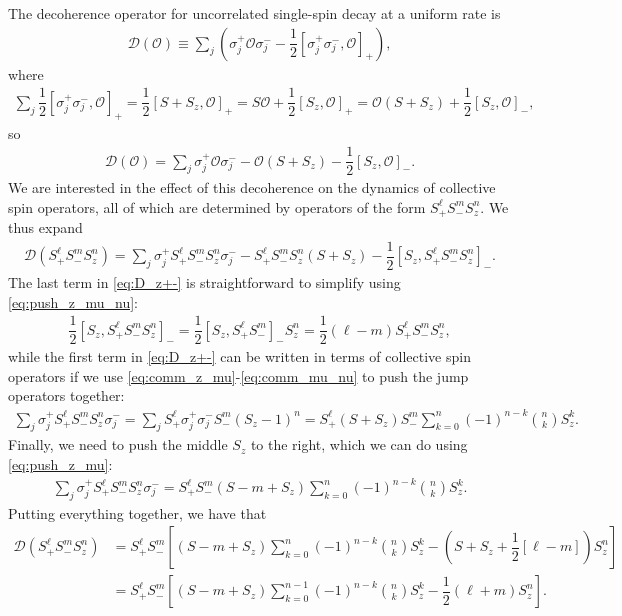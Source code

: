 \documentclass[aps,notitlepage,nofootinbib,11pt]{revtex4-1}
\newcommand{\f}[2]{\dfrac{#1}{#2}} %
\newcommand{\p}[1]{\left(#1\right)} %
\renewcommand{\sp}[1]{\left[#1\right]} %
\newcommand{\D}{\mathcal{D}}
\renewcommand{\O}{\mathcal{O}}
\newcommand{\1}{\mathds{1}}
\begin{document}
The decoherence operator for uncorrelated single-spin decay at a
uniform rate is
\begin{align}
  \D\p{\O}
  \equiv \sum_j\p{\sigma_j^+\O\sigma_j^-
    - \f12\sp{\sigma_j^+\sigma_j^-,\O}_+},
\end{align}
where
\begin{align}
  \sum_j \f12\sp{\sigma_j^+\sigma_j^-,\O}_+
  = \f12\sp{S+S_z,\O}_+
  = S\O + \f12\sp{S_z,\O}_+
  = \O\p{S+S_z} + \f12\sp{S_z,\O}_-,
\end{align}
so
\begin{align}
  \D\p{\O}
  = \sum_j \sigma_j^+\O\sigma_j^- - \O\p{S + S_z} - \f12 \sp{S_z,\O}_-.
\end{align}
We are interested in the effect of this decoherence on the dynamics of
collective spin operators, all of which are determined by operators of
the form $S_+^\ell S_-^m S_z^n$.  We thus expand
\begin{align}
  \D\p{S_+^\ell S_-^m S_z^n}
  = \sum_j \sigma_j^+ S_+^\ell S_-^m S_z^n \sigma_j^-
  - S_+^\ell S_-^m S_z^n \p{S + S_z}
  - \f12 \sp{S_z, S_+^\ell S_-^m S_z^n}_-.
  \label{eq:D_z+-}
\end{align}
The last term in \eqref{eq:D_z+-} is straightforward to simplify using
\eqref{eq:push_z_mu_nu}:
\begin{align}
  \f12 \sp{S_z, S_+^\ell S_-^m S_z^n}_-
  = \f12 \sp{S_z, S_+^\ell S_-^m}_- S_z^n
  = \f12 \p{\ell-m} S_+^\ell S_-^m S_z^n,
\end{align}
while the first term in \eqref{eq:D_z+-} can be written in terms of
collective spin operators if we use
\eqref{eq:comm_z_mu}-\eqref{eq:comm_mu_nu} to push the jump operators
together:
\begin{align}
  \sum_j \sigma_j^+ S_+^\ell S_-^m S_z^n \sigma_j^-
  = \sum_j S_+^\ell \sigma_j^+ \sigma_j^- S_-^m \p{S_z-1}^n
  = S_+^\ell \p{S + S_z} S_-^m
  \sum_{k=0}^n \p{-1}^{n-k} { n \choose k } S_z^k.
\end{align}
Finally, we need to push the middle $S_z$ to the right, which we can
do using \eqref{eq:push_z_mu}:
\begin{align}
  \sum_j \sigma_j^+ S_+^\ell S_-^m S_z^n \sigma_j^-
  = S_+^\ell S_-^m \p{S - m + S_z}
  \sum_{k=0}^n \p{-1}^{n-k} { n \choose k } S_z^k.
\end{align}
Putting everything together, we have that
\begin{align}
  \D\p{S_+^\ell S_-^m S_z^n}
  &= S_+^\ell S_-^m \sp{\p{S - m + S_z} \sum_{k=0}^n
    \p{-1}^{n-k} { n \choose k } S_z^k
    - \p{S + S_z + \f12\sp{\ell-m}} S_z^n} \\
  &= S_+^\ell S_-^m \sp{\p{S - m + S_z} \sum_{k=0}^{n-1}
    \p{-1}^{n-k} { n \choose k } S_z^k - \f12 \p{\ell+m} S_z^n}.
\end{align}
\end{document}
